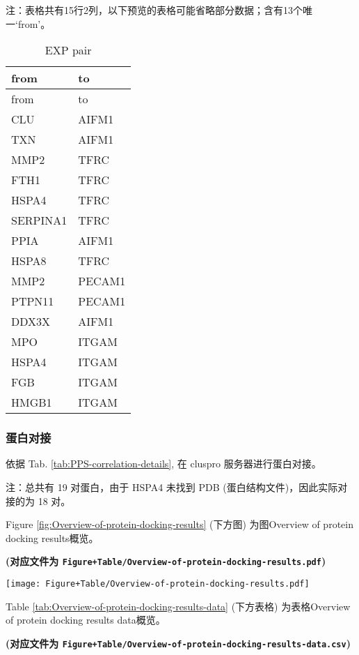 \documentclass[
]{article}
\begin{document}
\begin{center}\begin{tcolorbox}[colback=gray!10, colframe=gray!50, width=0.9\linewidth, arc=1mm, boxrule=0.5pt]注：表格共有15行2列，以下预览的表格可能省略部分数据；含有13个唯一`from'。
\end{tcolorbox}
\end{center}

\begin{longtable}[]{@{}ll@{}}
\caption{\label{tab:EXP-pair}EXP pair}\tabularnewline
\toprule
from & to\tabularnewline
\midrule
\endfirsthead
\toprule
from & to\tabularnewline
\midrule
\endhead
CLU & AIFM1\tabularnewline
TXN & AIFM1\tabularnewline
MMP2 & TFRC\tabularnewline
FTH1 & TFRC\tabularnewline
HSPA4 & TFRC\tabularnewline
SERPINA1 & TFRC\tabularnewline
PPIA & AIFM1\tabularnewline
HSPA8 & TFRC\tabularnewline
MMP2 & PECAM1\tabularnewline
PTPN11 & PECAM1\tabularnewline
DDX3X & AIFM1\tabularnewline
MPO & ITGAM\tabularnewline
HSPA4 & ITGAM\tabularnewline
FGB & ITGAM\tabularnewline
HMGB1 & ITGAM\tabularnewline
\bottomrule
\end{longtable}

\hypertarget{ux86cbux767dux5bf9ux63a5}{%
\subsubsection{蛋白对接}\label{ux86cbux767dux5bf9ux63a5}}

依据 Tab. \ref{tab:PPS-correlation-details},
在 cluspro 服务器进行蛋白对接。

注：总共有 19 对蛋白，由于 HSPA4 未找到 PDB (蛋白结构文件)，因此实际对接的为 18 对。

Figure \ref{fig:Overview-of-protein-docking-results} (下方图) 为图Overview of protein docking results概览。

\textbf{(对应文件为 \texttt{Figure+Table/Overview-of-protein-docking-results.pdf})}

\def\@captype{figure}
\begin{center}
\texttt{[image: Figure+Table/Overview-of-protein-docking-results.pdf]}
\caption{Overview of protein docking results}\label{fig:Overview-of-protein-docking-results}
\end{center}

Table \ref{tab:Overview-of-protein-docking-results-data} (下方表格) 为表格Overview of protein docking results data概览。

\textbf{(对应文件为 \texttt{Figure+Table/Overview-of-protein-docking-results-data.csv})}
\end{document}
